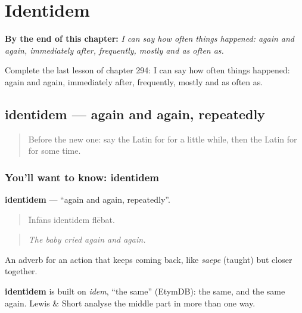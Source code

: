 
\chapter{Identidem}
\label{ch:la-identidem}

\begin{chapteropening}
\textbf{By the end of this chapter:} \emph{I can say how often things happened: again and again, immediately after, frequently, mostly and as often as.}

Complete the last lesson of chapter 294: I can say how often things happened: again and again, immediately after, frequently, mostly and as often as.
\end{chapteropening}

\section[identidem]{identidem — again and again, repeatedly}

\label{lesson:LA-C294-identidem}



\begin{quote}
Before the new one: say the Latin for for a little while, then the Latin for for some time.
\end{quote}

\subsection*{You'll want to know: identidem}
\textbf{identidem} — \textquotedblleft{}again and again, repeatedly\textquotedblright{}.

\begin{quote}
Īnfāns identidem flēbat.
\end{quote}

\begin{quote}
\emph{The baby cried again and again.}
\end{quote}

An adverb for an action that keeps coming back, like \emph{saepe} (taught) but closer together.

\begin{cousinweb}
\textbf{identidem} is built on \emph{idem}, \textquotedblleft{}the same\textquotedblright{} (EtymDB): the same, and the same again. Lewis \& Short analyse the middle part in more than one way.
\end{cousinweb}

